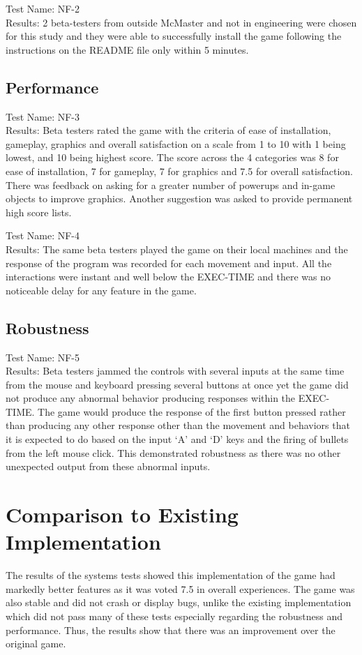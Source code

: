 \documentclass[12pt, titlepage]{article}
\begin{document}
\bigskip
\noindent Test Name: NF-2
\\ Results: 2 beta-testers from outside McMaster and not in engineering were chosen for this study and they were able to successfully install the game following the instructions on the README file only within 5 minutes. 

\subsection{Performance}
Test Name: NF-3
\\ Results:  Beta testers rated the game with the criteria of ease of installation, gameplay, graphics and overall satisfaction on a scale from 1 to 10 with 1 being lowest, and 10 being highest score. The score across the 4 categories was 8 for ease of installation, 7 for gameplay, 7 for graphics and 7.5 for overall satisfaction. There was feedback on asking for a greater number of powerups and in-game objects to improve graphics. Another suggestion was asked to provide permanent high score lists. 

\bigskip
\noindent Test Name: NF-4
\\ Results:  The same beta testers played the game on their local machines and the response of the program was recorded for each movement and input. All the interactions were instant and well below the EXEC-TIME and there was no noticeable delay for any feature in the game.

\subsection{Robustness}
Test Name: NF-5
\\ Results:  Beta testers jammed the controls with several inputs at the same time from the mouse and keyboard pressing several buttons at once yet the game did not produce any abnormal behavior producing responses within the EXEC-TIME. The game would produce the response of the first button pressed rather than producing any other response other than the movement and behaviors that it is expected to do based on the input `A' and `D' keys and the firing of bullets from the left mouse click. This demonstrated robustness as there was no other unexpected output from these abnormal inputs.
    
\section{Comparison to Existing Implementation}
The results of the systems tests showed this implementation of the game had markedly better features as it was voted 7.5 in overall experiences. The game was also stable and did not crash or display bugs, unlike the existing implementation which did not pass many of these tests especially regarding the robustness and performance. Thus, the results show that there was an improvement over the original game. 
\end{document}
